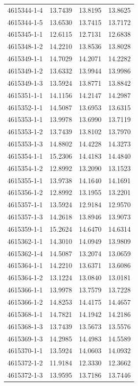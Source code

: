 \begin{longtable}{lrrr}
4615344-1-4 & 13.7439 & 13.8195 & 13.8625 \\
4615344-1-5 & 13.6530 & 13.7415 & 13.7172 \\
4615345-1-1 & 12.6115 & 12.7131 & 12.6838 \\
4615348-1-2 & 14.2210 & 13.8536 & 13.8028 \\
4615349-1-1 & 14.7029 & 14.2071 & 14.2282 \\
4615349-1-2 & 13.6332 & 13.9944 & 13.9986 \\
4615349-1-3 & 13.5924 & 13.8771 & 13.8842 \\
4615351-1-1 & 14.1156 & 14.2147 & 14.2987 \\
4615352-1-1 & 14.5087 & 13.6953 & 13.6315 \\
4615353-1-1 & 13.9978 & 13.6990 & 13.7119 \\
4615353-1-2 & 13.7439 & 13.8102 & 13.7970 \\
4615353-1-3 & 14.8802 & 14.4228 & 14.3273 \\
4615354-1-1 & 15.2306 & 14.4183 & 14.4840 \\
4615354-1-2 & 12.8992 & 13.2090 & 13.1523 \\
4615355-1-1 & 13.9738 & 14.1640 & 14.1691 \\
4615356-1-2 & 12.8992 & 13.1955 & 13.2201 \\
4615357-1-1 & 13.5924 & 12.9184 & 12.9570 \\
4615357-1-3 & 14.2618 & 13.8946 & 13.9073 \\
4615359-1-1 & 15.2624 & 14.6470 & 14.6314 \\
4615362-1-1 & 14.3010 & 14.0949 & 13.9809 \\
4615362-1-4 & 14.5087 & 13.2074 & 13.0659 \\
4615364-1-1 & 14.2210 & 13.6371 & 13.6086 \\
4615364-1-2 & 13.1224 & 13.0840 & 13.0181 \\
4615366-1-1 & 13.9978 & 13.7579 & 13.7228 \\
4615366-1-2 & 14.8253 & 14.4175 & 14.4657 \\
4615368-1-1 & 14.7821 & 14.1942 & 14.2186 \\
4615368-1-3 & 13.7439 & 13.5673 & 13.5576 \\
4615369-1-3 & 14.2985 & 14.4983 & 14.5589 \\
4615370-1-1 & 13.5924 & 14.0603 & 14.0932 \\
4615372-1-2 & 11.9184 & 12.3330 & 12.3662 \\
4615372-1-3 & 13.9595 & 13.7186 & 13.7446 \\

\end{longtable}
